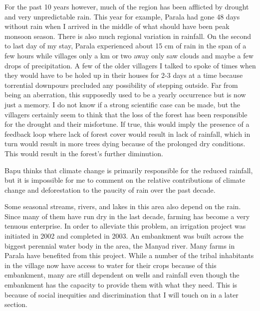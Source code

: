 \documentclass{report}
\begin{document}
For the past 10 years however, much of the region has been afflicted by drought and very unpredictable rain. This year for example, Parala had gone 48 days without rain when I arrived in the middle of what should have been peak monsoon season. There is also much regional variation in rainfall. On the second to last day of my stay, Parala experienced about 15 cm of rain in the span of a few hours while villages only a km or two away only saw clouds and maybe a few drops of precipitation. A few of the older villagers I talked to spoke of times when they would have to be holed up in their houses for 2-3 days at a time because torrential downpours precluded any possibility of stepping outside. Far from being an aberration, this supposedly used to be a yearly occurrence but is now just a memory. I do not know if a strong scientific case can be made, but the villagers certainly seem to think that the loss of the forest has been responsible for the drought and their misfortune. If true, this would imply the presence of a feedback loop where lack of forest cover would result in lack of rainfall, which in turn would result in more trees dying because of the prolonged dry conditions. This would result in the forest's further diminution.

Bapu thinks that climate change is primarily responsible for the reduced rainfall, but it is impossible for me to comment on the relative contributions of climate change and deforestation to the paucity of rain over the past decade.

Some seasonal streams, rivers, and lakes in this area also depend on the rain. Since many of them have run dry in the last decade, farming has become a very tenuous enterprise. In order to alleviate this problem, an irrigation project was initiated in 2002 and completed in 2003. An embankment was built across the biggest perennial water body in the area, the Manyad river. Many farms in Parala have benefited from this project. While a number of the tribal inhabitants in the village now have access to water for their crops because of this embankment, many are still dependent on wells and rainfall even though the embankment has the capacity to provide them with what they need. This is because of social inequities and discrimination that I will touch on in a later section.

\newpage



\end{document}
